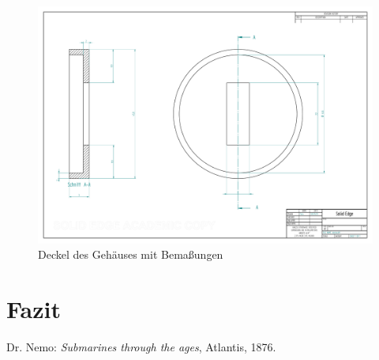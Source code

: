 \documentclass[a4paper,
DIV=13,
12pt,
BCOR=10mm,
department=FakEI,
parskip=half,
automark,
]{article}
\begin{document}
\begin{figure}[!hbpt]
 \begin{center} \includegraphics[width=1.4\textwidth,angle=-90]{Deckel.pdf}
 \caption{Deckel des Gehäuses mit Bemaßungen}
 \label{fig:Deckel}
  \end{center}
\end{figure}


\section{Fazit}








\cleardoublepage
\begin{appendix}
\listoffigures

\cleardoublepage
\begin{thebibliography}{99}
 Dr. Nemo: \textit{Submarines through the ages}, Atlantis, 1876.
\end{thebibliography}

\cleardoublepage

\end{appendix}
\end{document}
